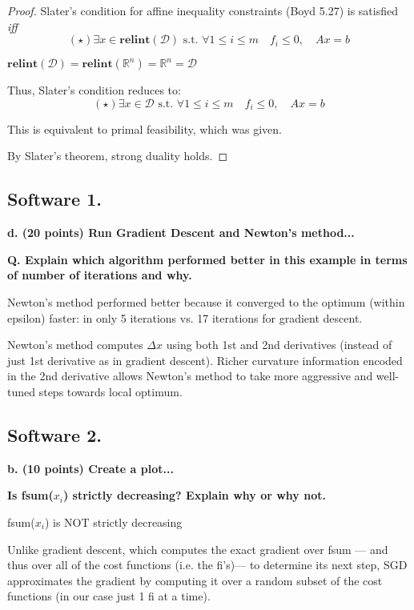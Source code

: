 \documentclass[a4paper,10pt]{article}
\theoremstyle{definition}
\begin{document}
\begin{proof}
Slater's condition for affine inequality constraints (Boyd 5.27) is satisfied \textit{iff}
\[
    (\star) \exists x\in \textbf{relint}(\mathcal{D}) \text{ s.t. } \forall 1\leq i\leq m 
    \quad f_i \leq 0, \quad Ax = b
\]


$\textbf{relint}(\mathcal{D}) = \textbf{relint}(\mathbb{R}^n) = \mathbb{R}^n = \mathcal{D}$


Thus, Slater's condition reduces to:
\[
    (\star) \exists x\in \mathcal{D} \text{ s.t. } \forall 1\leq i\leq m 
    \quad f_i \leq 0, \quad Ax = b
\]

This is equivalent to primal feasibility, which was given.

By Slater's theorem, strong duality holds.
\end{proof}



\subsection*{Software 1. }

\textbf{d. (20 points) Run Gradient Descent and Newton's method...}

\textbf{Q. Explain which algorithm performed better in this example in terms of number of iterations and why.}

Newton's method performed better because it converged to the
optimum (within epsilon) faster: in only 5 iterations vs.
17 iterations for gradient descent.

Newton's method computes $\Delta x$ using both 1st and 2nd derivatives 
(instead of just 1st derivative as in gradient descent).
Richer curvature information encoded in the 2nd derivative allows Newton's 
method to take more aggressive and well-tuned steps towards local optimum.

\subsection*{Software 2.}

\textbf{b. (10 points) Create a plot...}

\textbf{Is fsum($x_i$) strictly decreasing? Explain why or why not.}

fsum($x_i$) is NOT strictly decreasing

Unlike gradient descent, which computes the exact gradient over fsum
–– and thus over all of the cost functions (i.e. the fi's)–– to determine its next step, 
SGD approximates the gradient by computing it over a random subset
of the cost functions (in our case just 1 fi at a time).
\end{document}
